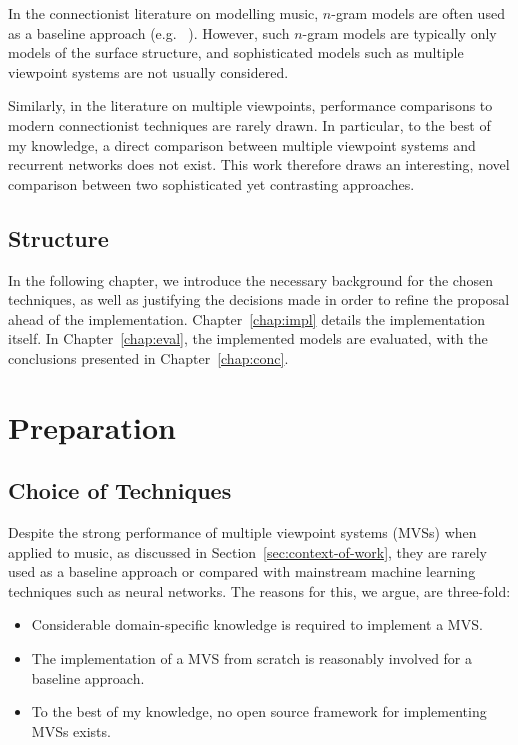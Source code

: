 \documentclass[12pt,a4paper,twoside,openright]{report}
\begin{document}
In the connectionist literature on modelling music, $n$-gram models are often
used as a baseline approach (e.g.\ \cite{boulanger2012modeling}
\cite{liangbachbot}). However, such $n$-gram models are typically only
models of the surface structure, and sophisticated models such as multiple
viewpoint systems are not usually considered.

Similarly, in the literature on multiple viewpoints, performance comparisons to
modern connectionist techniques are rarely drawn. In particular, to the best of
my knowledge, a direct comparison between multiple viewpoint systems and
recurrent networks does not exist. This work therefore draws an interesting, 
novel comparison between two sophisticated yet contrasting approaches.

\section{Structure}

In the following chapter, we introduce the necessary background for the chosen
techniques, as well as justifying the decisions made in order to refine the
proposal ahead of the implementation.  Chapter~\ref{chap:impl} details the
implementation itself. In Chapter~\ref{chap:eval}, the implemented models are
evaluated, with the conclusions presented in Chapter~\ref{chap:conc}.

\chapter{Preparation}

\section{Choice of Techniques}

Despite the strong performance of multiple viewpoint systems (MVSs) when applied
to music, as discussed in Section~\ref{sec:context-of-work}, they are rarely
used as a baseline approach or compared with mainstream machine learning
techniques such as neural networks. The reasons for this, we argue, are
three-fold:
\begin{itemize}
  \item Considerable domain-specific knowledge is required to implement a MVS.
  \item The implementation of a MVS from scratch is reasonably involved for a
    baseline approach.
  \item To the best of my knowledge, no open source framework for implementing
    MVSs exists.
\end{itemize}
\end{document}
